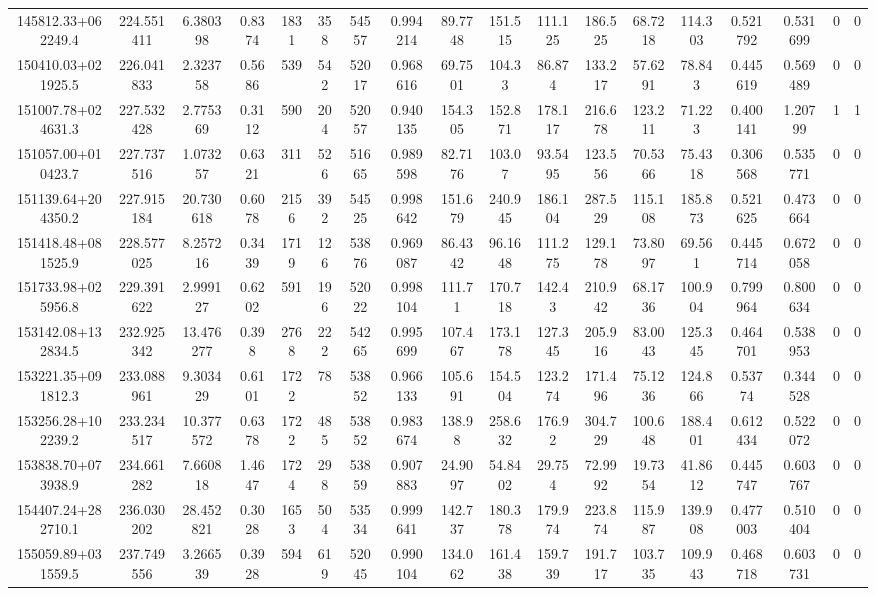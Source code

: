 \begin{table}
\begin{tabular}{cccccccccccccccccc}
145812.33+062249.4 & 224.551411 & 6.380398 & 0.8374 & 1831 & 358 & 54557 & 0.994214 & 89.7748 & 151.515 & 111.125 & 186.525 & 68.7218 & 114.303 & 0.521792 & 0.531699 & 0 & 0 \\
150410.03+021925.5 & 226.041833 & 2.323758 & 0.5686 & 539 & 542 & 52017 & 0.968616 & 69.7501 & 104.33 & 86.874 & 133.217 & 57.6291 & 78.843 & 0.445619 & 0.569489 & 0 & 0 \\
151007.78+024631.3 & 227.532428 & 2.775369 & 0.3112 & 590 & 204 & 52057 & 0.940135 & 154.305 & 152.871 & 178.117 & 216.678 & 123.211 & 71.223 & 0.400141 & 1.20799 & 1 & 1 \\
151057.00+010423.7 & 227.737516 & 1.073257 & 0.6321 & 311 & 526 & 51665 & 0.989598 & 82.7176 & 103.07 & 93.5495 & 123.556 & 70.5366 & 75.4318 & 0.306568 & 0.535771 & 0 & 0 \\
151139.64+204350.2 & 227.915184 & 20.730618 & 0.6078 & 2156 & 392 & 54525 & 0.998642 & 151.679 & 240.945 & 186.104 & 287.529 & 115.108 & 185.873 & 0.521625 & 0.473664 & 0 & 0 \\
151418.48+081525.9 & 228.577025 & 8.257216 & 0.3439 & 1719 & 126 & 53876 & 0.969087 & 86.4342 & 96.1648 & 111.275 & 129.178 & 73.8097 & 69.561 & 0.445714 & 0.672058 & 0 & 0 \\
151733.98+025956.8 & 229.391622 & 2.999127 & 0.6202 & 591 & 196 & 52022 & 0.998104 & 111.71 & 170.718 & 142.43 & 210.942 & 68.1736 & 100.904 & 0.799964 & 0.800634 & 0 & 0 \\
153142.08+132834.5 & 232.925342 & 13.476277 & 0.398 & 2768 & 222 & 54265 & 0.995699 & 107.467 & 173.178 & 127.345 & 205.916 & 83.0043 & 125.345 & 0.464701 & 0.538953 & 0 & 0 \\
153221.35+091812.3 & 233.088961 & 9.303429 & 0.6101 & 1722 & 78 & 53852 & 0.966133 & 105.691 & 154.504 & 123.274 & 171.496 & 75.1236 & 124.866 & 0.53774 & 0.344528 & 0 & 0 \\
153256.28+102239.2 & 233.234517 & 10.377572 & 0.6378 & 1722 & 485 & 53852 & 0.983674 & 138.98 & 258.632 & 176.92 & 304.729 & 100.648 & 188.401 & 0.612434 & 0.522072 & 0 & 0 \\
153838.70+073938.9 & 234.661282 & 7.660818 & 1.4647 & 1724 & 298 & 53859 & 0.907883 & 24.9097 & 54.8402 & 29.754 & 72.9992 & 19.7354 & 41.8612 & 0.445747 & 0.603767 & 0 & 0 \\
154407.24+282710.1 & 236.030202 & 28.452821 & 0.3028 & 1653 & 504 & 53534 & 0.999641 & 142.737 & 180.378 & 179.974 & 223.874 & 115.987 & 139.908 & 0.477003 & 0.510404 & 0 & 0 \\
155059.89+031559.5 & 237.749556 & 3.266539 & 0.3928 & 594 & 619 & 52045 & 0.990104 & 134.062 & 161.438 & 159.739 & 191.717 & 103.735 & 109.943 & 0.468718 & 0.603731 & 0 & 0 \\

\end{tabular}
\end{table}
